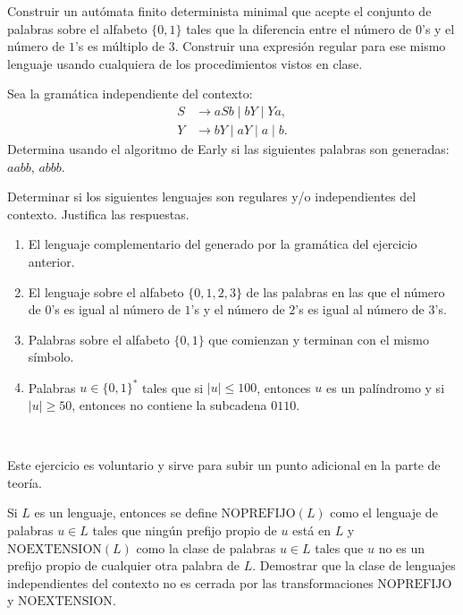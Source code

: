 \documentclass[12pt]{article}
\begin{document}
    \begin{ejercicio}[2.5 puntos]
        Construir un autómata finito determinista minimal que acepte el conjunto de palabras sobre el alfabeto $\{0, 1\}$ tales que la diferencia entre el número de $0$'s y el número de $1$'s es múltiplo de $3$. Construir una expresión regular para ese mismo lenguaje usando cualquiera de los procedimientos vistos en clase.
    \end{ejercicio}

    \begin{ejercicio}[2.5 puntos]
        Sea la gramática independiente del contexto:
        \[
            \begin{aligned}
                S &\to aSb \mid bY \mid Ya, \\
                Y &\to bY \mid aY \mid a \mid b.
            \end{aligned}
        \]
        Determina usando el algoritmo de Early si las siguientes palabras son generadas: $aabb$, $abbb$.
    \end{ejercicio}

    \begin{ejercicio}[2.5 puntos]
        Determinar si los siguientes lenguajes son regulares y/o independientes del contexto. Justifica las respuestas.
        \begin{enumerate}
            \item El lenguaje complementario del generado por la gramática del ejercicio anterior.
            \item El lenguaje sobre el alfabeto $\{0, 1, 2, 3\}$ de las palabras en las que el número de $0$'s es igual al número de $1$'s y el número de $2$'s es igual al número de $3$'s.
            \item Palabras sobre el alfabeto $\{0, 1\}$ que comienzan y terminan con el mismo símbolo.
            \item Palabras $u \in \{0, 1\}^*$ tales que si $|u| \leq 100$, entonces $u$ es un palíndromo y si $|u| \geq 50$, entonces no contiene la subcadena $0110$.
        \end{enumerate}
    \end{ejercicio}

    \begin{ejercicio}[1 punto]~
        \begin{observacion}
            Este ejercicio es voluntario y sirve para subir un punto adicional en la parte de teoría.
        \end{observacion}
        Si $L$ es un lenguaje, entonces se define $\text{NOPREFIJO}(L)$ como el lenguaje de palabras $u \in L$ tales que ningún prefijo propio de $u$ está en $L$ y $\text{NOEXTENSION}(L)$ como la clase de palabras $u \in L$ tales que $u$ no es un prefijo propio de cualquier otra palabra de $L$. Demostrar que la clase de lenguajes independientes del contexto no es cerrada por las transformaciones $\text{NOPREFIJO}$ y $\text{NOEXTENSION}$.
    \end{ejercicio}
\end{document}
